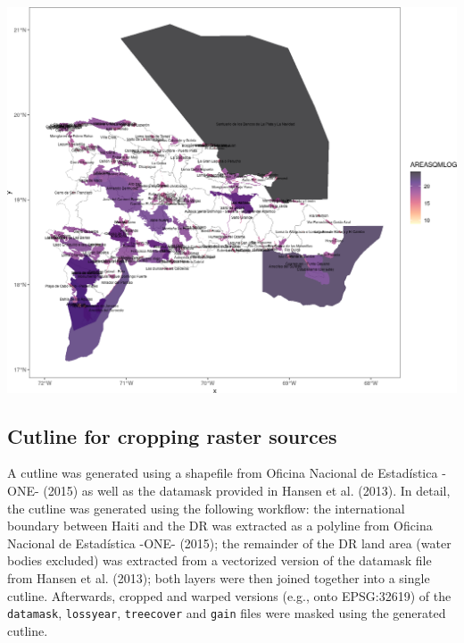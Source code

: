 \documentclass[10pt,landscape,a3paper]{article}
\begin{document}
\begin{center}\includegraphics{img/unnamed-chunk-6-1} \end{center}

\hypertarget{cutline-for-cropping-raster-sources}{%
\subsection{Cutline for cropping raster
sources}\label{cutline-for-cropping-raster-sources}}

A cutline was generated using a shapefile from Oficina Nacional de
Estadística -ONE- (2015) as well as the datamask provided in Hansen et
al. (2013). In detail, the cutline was generated using the following
workflow: the international boundary between Haiti and the DR was
extracted as a polyline from Oficina Nacional de Estadística -ONE-
(2015); the remainder of the DR land area (water bodies excluded) was
extracted from a vectorized version of the datamask file from Hansen et
al. (2013); both layers were then joined together into a single cutline.
Afterwards, cropped and warped versions (e.g., onto EPSG:32619) of the
\texttt{datamask}, \texttt{lossyear}, \texttt{treecover} and
\texttt{gain} files were masked using the generated cutline.
\end{document}
